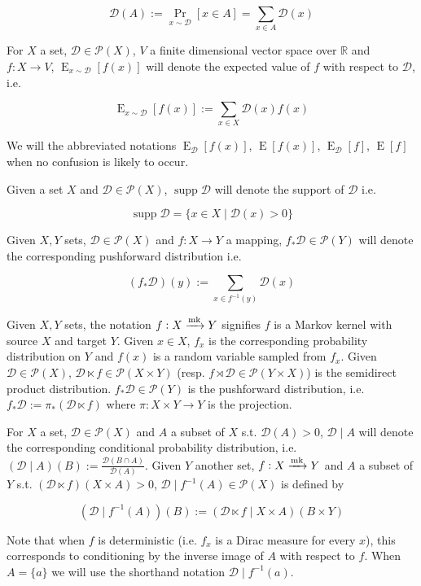 \documentclass{article}
\numberwithin{equation}{section}
\theoremstyle{definition}
\theoremstyle{plain}
\DeclareMathOperator{\Supp}{supp}
\DeclareMathOperator{\Prb}{Pr}
\DeclareMathOperator{\E}{E}
\newcommand{\Reals}{\mathbb{R}}
\newcommand{\Dist}{\mathcal{D}}
\newcommand{\Markov}{\xrightarrow{\textnormal{mk}}}
\begin{document}
\[\Dist(A):=\Prb_{x \sim \Dist}[x \in A] = \sum_{x \in A} \Dist(x)\]

For $X$ a set, $\Dist \in \mathcal{P}(X)$, $V$ a finite dimensional vector space over $\Reals$ and $f: X \rightarrow V$, $\E_{x \sim \Dist}[f(x)]$ will denote the expected value of $f$ with respect to $\Dist$, i.e. 

\[\E_{x \sim \Dist}[f(x)] := \sum_{x \in X} \Dist(x) f(x)\]

We will the abbreviated notations $\E_\Dist[f(x)]$, $\E[f(x)]$, $\E_\Dist[f]$, $\E[f]$ when no confusion is likely to occur.

Given a set $X$ and $\Dist \in \mathcal{P}(X)$, $\Supp \Dist$ will denote the support of $\Dist$ i.e.

\[\Supp \Dist = \{x \in X \mid \Dist(x) > 0\}\]

Given $X,Y$ sets, $\Dist \in \mathcal{P}(X)$ and $f: X \rightarrow Y$ a mapping, $f_*\Dist \in \mathcal{P}(Y)$ will denote the corresponding pushforward distribution i.e.

\[(f_*\Dist)(y):= \sum_{x \in f^{-1}(y)} \Dist(x)\]

Given $X,Y$ sets, the notation $f: X \xrightarrow{\textnormal{mk}} Y$ signifies $f$ is a Markov kernel with source $X$ and target $Y$. Given $x \in X$, $f_x$ is the corresponding probability distribution on $Y$ and $f(x)$ is a random variable sampled from $f_x$. Given $\Dist \in \mathcal{P}(X)$, $\Dist \ltimes f \in \mathcal{P}(X \times Y)$ (resp. $f \rtimes \Dist \in \mathcal{P}(Y \times X)$) is the semidirect product distribution. $f_*\Dist \in \mathcal{P}(Y)$ is the pushforward distribution, i.e. $f_*\Dist:=\pi_*(\Dist \ltimes f)$ where $\pi: X \times Y \rightarrow Y$ is the projection.

For $X$ a set, $\Dist \in \mathcal{P}(X)$ and $A$ a subset of $X$ s.t. ${\Dist(A) > 0}$, $\Dist \mid A$ will denote the corresponding conditional probability distribution, i.e. $(\Dist \mid A)(B):=\frac{\Dist(B \cap A)}{\Dist(A)}$. Given $Y$ another set, $f: X \Markov Y$ and $A$ a subset of $Y$ s.t. $(\Dist \ltimes f)(X \times A) > 0$, $\Dist \mid f^{-1}(A) \in \mathcal{P}(X)$ is defined by 

\[(\Dist \mid f^{-1}(A))(B):=(\Dist \ltimes f \mid X \times A)(B \times Y)\]

Note that when $f$ is deterministic (i.e. $f_x$ is a Dirac measure for every $x$), this corresponds to conditioning by the inverse image of $A$ with respect to $f$. When $A=\{a\}$ we will use the shorthand notation $\Dist \mid f^{-1}(a)$.
\end{document}
